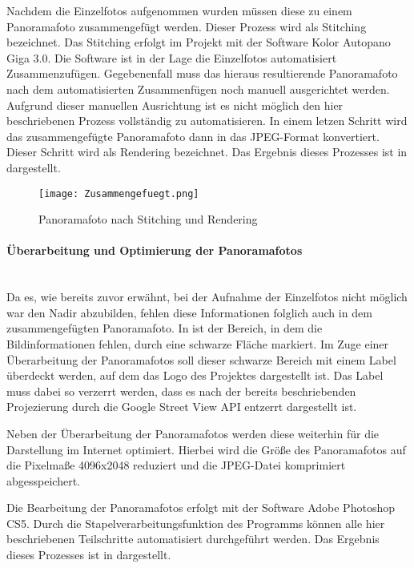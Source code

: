 Nachdem die Einzelfotos aufgenommen wurden müssen diese zu einem Panoramafoto
zusammengefügt werden. Dieser Prozess wird als Stitching bezeichnet. Das
Stitching erfolgt im Projekt mit der Software Kolor Autopano Giga 3.0. Die
Software ist in der Lage die Einzelfotos automatisiert Zusammenzufügen.
Gegebenenfall muss das hieraus resultierende Panoramafoto nach dem
automatisierten Zusammenfügen noch manuell ausgerichtet werden. Aufgrund
dieser manuellen Ausrichtung ist es nicht möglich den hier beschriebenen
Prozess vollständig zu automatisieren. In einem letzen Schritt wird das
zusammengefügte Panoramafoto dann in das JPEG-Format konvertiert. Dieser Schritt
wird als Rendering bezeichnet. Das Ergebnis dieses Prozesses ist in
 dargestellt.

\begin{figure}[htb]
\centering
\texttt{[image: Zusammengefuegt.png]}
\caption[Panoramafoto nach Stitching und Rendering]{Panoramafoto nach Stitching
und Rendering\protect\footnotemark}
\label{fig:Zusammengefuegt}
\end{figure}

\paragraph{Überarbeitung und Optimierung der Panoramafotos} \hfill \\

Da es, wie bereits zuvor erwähnt, bei der Aufnahme der Einzelfotos nicht möglich
war den Nadir abzubilden, fehlen diese Informationen folglich auch in dem
zusammengefügten Pa\-no\-ra\-ma\-fo\-to. In  ist der
Bereich, in dem die Bildinformationen fehlen, durch eine schwarze Fläche
markiert. Im Zuge einer Überarbeitung der Panoramafotos soll dieser schwarze
Bereich mit einem Label überdeckt werden, auf dem das Logo des Projektes
dargestellt ist. Das Label muss dabei so verzerrt werden, dass es nach der
bereits beschriebenden Projezierung durch die Google Street View API entzerrt
dargestellt ist.

Neben der Überarbeitung der Panoramafotos werden diese weiterhin für die
Darstellung im Internet optimiert. Hierbei wird die Größe des Panoramafotos auf
die Pixelmaße 4096x2048 reduziert und die JPEG-Datei komprimiert abgesspeichert.

Die Bearbeitung der Panoramafotos erfolgt mit der Software Adobe Photoshop CS5.
Durch die Stapelverarbeitungsfunktion des Programms können alle hier
beschriebenen Teilschritte automatisiert durchgeführt werden. Das Ergebnis
dieses Prozesses ist in  dargestellt.

